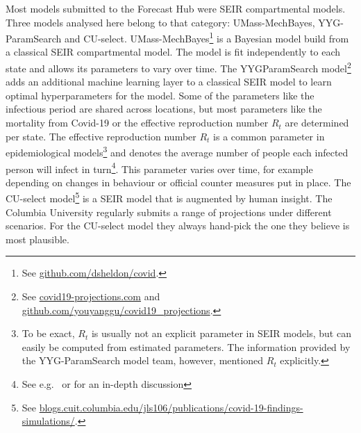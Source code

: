 \documentclass[
]{book}
\begin{document}
Most models submitted to the Forecast Hub were SEIR compartmental models. Three models analysed here belong to that category: UMass-MechBayes, YYG-ParamSearch and CU-select. UMass-MechBayes\footnote{See \href{https://github.com/dsheldon/covid}{github.com/dsheldon/covid}.} is a Bayesian model build from a classical SEIR compartmental model. The model is fit independently to each state and allows its parameters to vary over time. The YYGParamSearch model\footnote{See \href{https://covid19-projections.com}{covid19-projections.com} and \href{https://github.com/youyanggu/covid19_projections}{github.com/youyanggu/covid19\_projections}.} adds an additional machine learning layer to a classical SEIR model to learn optimal hyperparameters for the model. Some of the parameters like the infectious period are shared across locations, but most parameters like the mortality from Covid-19 or the effective reproduction number \(R_t\) are determined per state. The effective reproduction number \(R_t\) is a common parameter in epidemiological models\footnote{To be exact, \(R_t\) is usually not an explicit parameter in SEIR models, but can easily be computed from estimated parameters. The information provided by the YYG-ParamSearch model team, however, mentioned \(R_t\) explicitly.} and denotes the average number of people each infected person will infect in turn\footnote{See e.g.~\citet{nishiuraEffectiveReproductionNumber2009} or \citet{coriNewFrameworkSoftware2013} for an in-depth discussion}. This parameter varies over time, for example depending on changes in behaviour or official counter measures put in place. The CU-select model\footnote{See \href{https://blogs.cuit.columbia.edu/jls106/publications/covid-19-findings-simulations/}{blogs.cuit.columbia.edu/jls106/publications/covid-19-findings-simulations/}.} is a SEIR model that is augmented by human insight. The Columbia University regularly submits a range of projections under different scenarios. For the CU-select model they always hand-pick the one they believe is most plausible.
\end{document}
